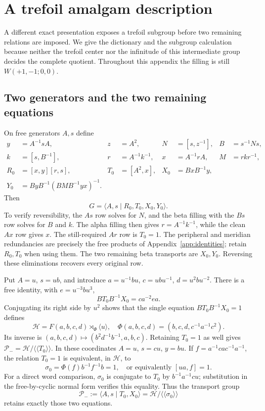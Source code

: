\documentclass[11pt]{amsart}
\theoremstyle{definition}
\theoremstyle{remark}
\newcommand{\nc}[1]{\langle\!\langle #1\rangle\!\rangle}
\begin{document}
\section{A trefoil amalgam description}\label{app:trefoil}

A different exact presentation exposes a trefoil subgroup before two
remaining relations are imposed. We give the dictionary and the
subgroup calculation because neither the trefoil center nor the
infinitude of this intermediate group decides the complete quotient.
Throughout this appendix the filling is still $W(+1,-1;0,0)$.

\subsection{Two generators and the two remaining equations}
On free generators $A,s$ define
\begin{equation}\label{eq:two-generator-dictionary}
\begin{aligned}
 y&=A^{-1}sA,&z&=A^2,&N&=[s,z^{-1}],&B&=s^{-1}Ns,\\
 k&=[s,B^{-1}],&r&=A^{-1}k^{-1},&x&=A^{-1}rA,&M&=rkr^{-1},\\
 R_0&=[x,y][r,s],&T_0&=[A^2,x],&X_0&=BxB^{-1}y,\\
 Y_0&=ByB^{-1}(BMB^{-1}yx)^{-1}.&&&&
\end{aligned}
\end{equation}
Then
\begin{equation}\label{eq:two-generator}
              G=\langle A,s\mid R_0,T_0,X_0,Y_0\rangle.
\end{equation}
To verify reversibility, the $As$ row solves for $N$, and the beta
filling with the $Bs$ row solves for $B$ and $k$. The alpha filling
then gives $r=A^{-1}k^{-1}$, while the clean $Ax$ row gives $x$.
The still-required $Ar$ row is $T_0=1$. The peripheral and meridian
redundancies are precisely the free products of
Appendix~\ref{app:identities}; retain $R_0,T_0$ when using them.
The two remaining beta transports are $X_0,Y_0$. Reversing these
eliminations recovers every original row.

Put $A=u$, $s=ub$, and introduce
$a=u^{-1}bu$, $c=ubu^{-1}$, $d=u^2bu^{-2}$.
There is a free identity, with $e=u^{-3}bu^3$,
\[
                  BT_0B^{-1}X_0=ca^{-2}ea.
\]
Conjugating its right side by $u^2$ shows that the single equation
$BT_0B^{-1}X_0=1$ defines
\[
 \mathcal H=F(a,b,c,d)\rtimes_\Phi\langle u\rangle,
 \quad
 \Phi(a,b,c,d)=(b,c,d,c^{-1}a^{-1}c^2).
\]
Its inverse is $(a,b,c,d)\mapsto(b^2d^{-1}b^{-1},a,b,c)$.
Retaining $T_0=1$ as well gives $\mathcal P_-=\mathcal H/\nc{T_0}$.
In these coordinates $A=u$, $s=cu$, $y=bu$.
If $f=a^{-1}cac^{-1}a^{-1}$, the relation $T_0=1$ is equivalent,
in $\mathcal H$, to
\[
 \sigma_0=\Phi(f)b^{-1}f^{-1}b=1,
                   \quad\text{or equivalently }[ua,f]=1.
\]
For a direct word comparison, $\sigma_0$ is conjugate to $T_0$
by $b^{-1}a^{-1}cu$; substitution in the free-by-cyclic normal form
verifies this equality. Thus the transport group
\[
 \mathcal P_-:=\langle A,s\mid T_0,X_0\rangle
                   =\mathcal H/\nc{\sigma_0}
\]
retains exactly those two equations.
\end{document}

